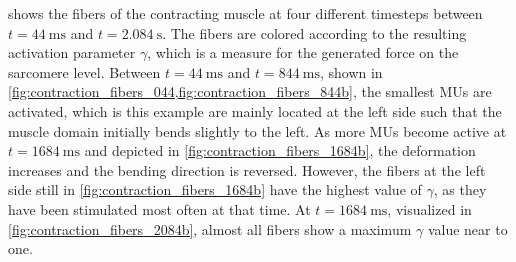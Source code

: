  shows the fibers of the contracting muscle at four different timesteps between $t=\SI{44}{\ms}$ and $t=\SI{2.084}{\s}$. The fibers are colored according to the resulting activation parameter $\gamma$, which is a measure for the generated force on the sarcomere level. Between $t=\SI{44}{\ms}$ and $t=\SI{844}{\ms}$, shown in \cref{fig:contraction_fibers_044,fig:contraction_fibers_844b}, the smallest MUs are activated, which is this example are mainly located at the left side such that the muscle domain initially bends slightly to the left. As more MUs become active at $t=\SI{1684}{\ms}$ and depicted in \cref{fig:contraction_fibers_1684b}, the deformation increases and the bending direction is reversed. However, the fibers at the left side still in \cref{fig:contraction_fibers_1684b} have the highest value of $\gamma$, as they have been stimulated most often at that time.
At $t=\SI{1684}{\ms}$, visualized in \cref{fig:contraction_fibers_2084b}, almost all fibers show a maximum $\gamma$ value near to one.

